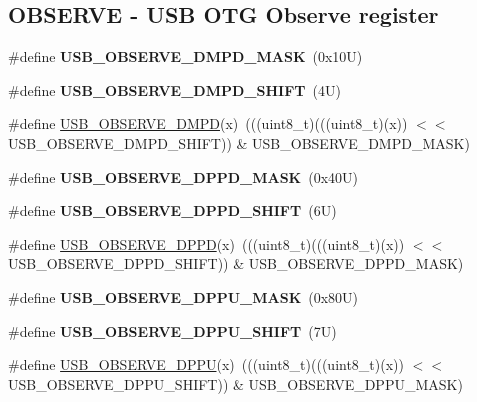 \subsection*{O\+B\+S\+E\+R\+VE -\/ U\+SB O\+TG Observe register}
\begin{DoxyCompactItemize}
\item 
\mbox{\label{group___u_s_b___register___masks_ga796850497f75cc88772d3826d1196a43}} 
\#define {\bfseries U\+S\+B\+\_\+\+O\+B\+S\+E\+R\+V\+E\+\_\+\+D\+M\+P\+D\+\_\+\+M\+A\+SK}~(0x10\+U)
\item 
\mbox{\label{group___u_s_b___register___masks_ga044fcfc292ba6db33ec4e847a6510440}} 
\#define {\bfseries U\+S\+B\+\_\+\+O\+B\+S\+E\+R\+V\+E\+\_\+\+D\+M\+P\+D\+\_\+\+S\+H\+I\+FT}~(4\+U)
\item 
\#define \mbox{\hyperlink{group___u_s_b___register___masks_gaa9e05cb77f4ac1c1dd88ba27574df3dc}{U\+S\+B\+\_\+\+O\+B\+S\+E\+R\+V\+E\+\_\+\+D\+M\+PD}}(x)~(((uint8\+\_\+t)(((uint8\+\_\+t)(x)) $<$$<$ U\+S\+B\+\_\+\+O\+B\+S\+E\+R\+V\+E\+\_\+\+D\+M\+P\+D\+\_\+\+S\+H\+I\+FT)) \& U\+S\+B\+\_\+\+O\+B\+S\+E\+R\+V\+E\+\_\+\+D\+M\+P\+D\+\_\+\+M\+A\+SK)
\item 
\mbox{\label{group___u_s_b___register___masks_ga8368ad607c0f5a0ab499734e26f36aad}} 
\#define {\bfseries U\+S\+B\+\_\+\+O\+B\+S\+E\+R\+V\+E\+\_\+\+D\+P\+P\+D\+\_\+\+M\+A\+SK}~(0x40\+U)
\item 
\mbox{\label{group___u_s_b___register___masks_gaba84f8caae5d942588bd678bbc2ad267}} 
\#define {\bfseries U\+S\+B\+\_\+\+O\+B\+S\+E\+R\+V\+E\+\_\+\+D\+P\+P\+D\+\_\+\+S\+H\+I\+FT}~(6\+U)
\item 
\#define \mbox{\hyperlink{group___u_s_b___register___masks_gab317284d7d9fc6132a9cd00293c69015}{U\+S\+B\+\_\+\+O\+B\+S\+E\+R\+V\+E\+\_\+\+D\+P\+PD}}(x)~(((uint8\+\_\+t)(((uint8\+\_\+t)(x)) $<$$<$ U\+S\+B\+\_\+\+O\+B\+S\+E\+R\+V\+E\+\_\+\+D\+P\+P\+D\+\_\+\+S\+H\+I\+FT)) \& U\+S\+B\+\_\+\+O\+B\+S\+E\+R\+V\+E\+\_\+\+D\+P\+P\+D\+\_\+\+M\+A\+SK)
\item 
\mbox{\label{group___u_s_b___register___masks_ga04f8b1d77478cb027a79323cef482965}} 
\#define {\bfseries U\+S\+B\+\_\+\+O\+B\+S\+E\+R\+V\+E\+\_\+\+D\+P\+P\+U\+\_\+\+M\+A\+SK}~(0x80\+U)
\item 
\mbox{\label{group___u_s_b___register___masks_ga08ff5b00473fda9eb458f3457490eb15}} 
\#define {\bfseries U\+S\+B\+\_\+\+O\+B\+S\+E\+R\+V\+E\+\_\+\+D\+P\+P\+U\+\_\+\+S\+H\+I\+FT}~(7\+U)
\item 
\#define \mbox{\hyperlink{group___u_s_b___register___masks_gac95d445b08a1a0abb32095b3b6213f14}{U\+S\+B\+\_\+\+O\+B\+S\+E\+R\+V\+E\+\_\+\+D\+P\+PU}}(x)~(((uint8\+\_\+t)(((uint8\+\_\+t)(x)) $<$$<$ U\+S\+B\+\_\+\+O\+B\+S\+E\+R\+V\+E\+\_\+\+D\+P\+P\+U\+\_\+\+S\+H\+I\+FT)) \& U\+S\+B\+\_\+\+O\+B\+S\+E\+R\+V\+E\+\_\+\+D\+P\+P\+U\+\_\+\+M\+A\+SK)
\end{DoxyCompactItemize}
